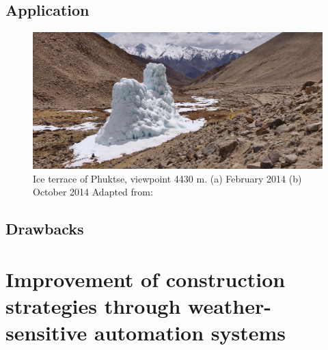 \subsection{Application}

\begin{figure}[t]
\centering
\includegraphics[width=12cm]{Figures/IS_example.jpg}

\caption{Ice terrace of Phuktse, viewpoint 4430 m. (a) February 2014 (b) October 2014 Adapted from: \cite{nusserSociohydrologyArtificialGlaciers2019}}

\label{fig:ISexample}
\end{figure}

\subsection{Drawbacks}

\section{Improvement of construction strategies through weather-sensitive automation systems}

